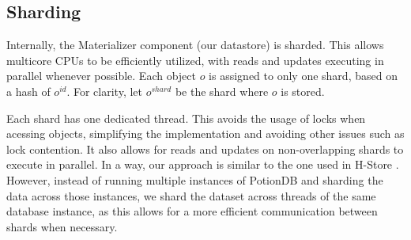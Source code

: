 \documentclass{vldb}
\begin{document}

\subsection{Sharding}
\label{subsec:sharding}


Internally, the Materializer component (our datastore) is sharded.
This allows multicore CPUs to be efficiently utilized,
with reads and updates executing in parallel whenever possible.
Each object $o$ is assigned to only one shard, based on a hash of $o^{id}$.
For clarity, let $o^{shard}$ be the shard where $o$ is stored.

Each shard has one dedicated thread.
This avoids the usage of locks when acessing objects, simplifying the implementation and avoiding other issues such as lock contention.
It also allows for reads and updates on non-overlapping shards to execute in parallel.
In a way, our approach is similar to the one used in H-Store \cite{h-store}.
However, instead of running multiple instances of PotionDB and sharding the data across those instances, we shard the dataset across threads of the same database instance, as this allows for a more efficient communication between shards when necessary.

\end{document}
